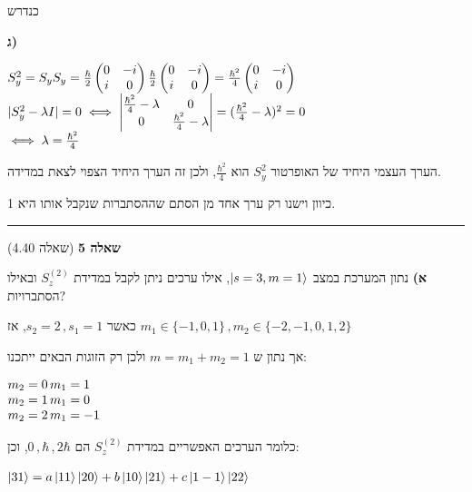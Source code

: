 \documentclass[14pt]{extarticle}
\makeatletter
\newenvironment{lefteqs}{%
    \begin{english}%
    \begin{flushleft}%
    \renewcommand{\arraystretch}{1.3}%
    $\begin{array}{@{}l@{}}%
}{%
    \end{array}$%
    \end{flushleft}%
    \end{english}%
}
\makeatother
\begin{document}
כנדרש

\textbf{ג)}
\begin{lefteqs}
    S_y^2 = S_y S_y = \frac{\hbar}{2} \begin{pmatrix}
        0 & -i \\
        i & 0
    \end{pmatrix} \frac{\hbar}{2} \begin{pmatrix}
        0 & -i \\
        i & 0 
    \end{pmatrix} = \frac{\hbar^2}{4} \begin{pmatrix}
        0 & -i \\
        i & 0
    \end{pmatrix} \\
    |S_y^2 - \lambda I| = 0 \iff \begin{vmatrix}
        \frac{\hbar^2}{4} - \lambda & 0 \\
        0 & \frac{\hbar^2}{4} - \lambda
    \end{vmatrix} = (\frac{\hbar^2}{4} - \lambda)^2 = 0  \\
    \iff \lambda = \frac{\hbar^2}{4} \\
\end{lefteqs}

הערך העצמי היחיד של האופרטור $S_y^2$ הוא $\frac{\hbar^2}{4}$, ולכן זה הערך היחיד הצפוי לצאת במדידה.

כיוון וישנו רק ערך אחד מן הסתם שההסתברות שנקבל אותו היא 1.

\vspace{3em}
\hrule
\vspace{2em}

\textbf{\large שאלה 5}
(שאלה 4.40)

\textbf{א)}
נתון המערכת במצב $\ket{s=3, m=1}$, אילו ערכים ניתן לקבל במדידת $S_z^{(2)}$ ובאילו הסתברויות?

כאשר $s_2=2 \, , s_1=1$, אז $m_1 \in \{-1, 0, 1\} \, , m_2 \in \{-2, -1, 0, 1, 2\}$

אך נתון ש $m=m_1 + m_2 = 1$ ולכן רק הזוגות הבאים ייתכנו:

\begin{lefteqs}
    m_2=0\, m_1=1 \\
    m_2=1\, m_1=0 \\
    m_2=2\, m_1=-1
\end{lefteqs}

כלומר הערכים האפשריים במדידת $S_z^{(2)}$ הם $0\, , \hbar\, , 2\hbar$, וכן:

\begin{lefteqs}
    \ket{3 1} = a\ket{1 1}\ket{2 0} + b\ket{1 0}\ket{2 1} + c\ket{1 -1} \ket{2 2} \\
\end{lefteqs}
\end{document}
